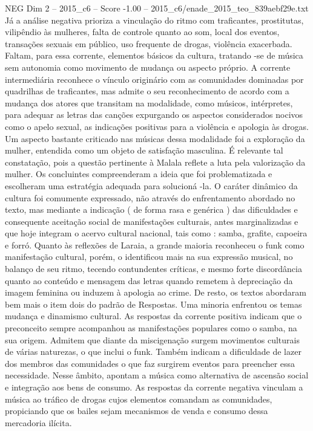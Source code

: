 \begin{textsample}{NEG Dim 2 – 2015\_c6 – Score -1.00 – 2015\_c6/enade\_2015\_teo\_839aebf29e.txt}
Já a análise negativa prioriza a vinculação do ritmo com traficantes, prostitutas, vilipêndio às mulheres, falta de controle quanto ao som, local dos eventos, transações sexuais em público, uso frequente de drogas, violência exacerbada.
Faltam, para essa corrente, elementos básicos da cultura, tratando -se de música sem autonomia como movimento de mudança ou aspecto próprio.
A corrente intermediária reconhece o vínculo originário com as comunidades dominadas por quadrilhas de traficantes, mas admite o seu reconhecimento de acordo com a mudança dos atores que transitam na modalidade, como músicos, intérpretes, para adequar as letras das canções expurgando os aspectos considerados nocivos como o apelo sexual, as indicações positivas para a violência e apologia às drogas.
Um aspecto bastante criticado nas músicas dessa modalidade foi a exploração da mulher, entendida como um objeto de satisfação masculina.
É relevante tal constatação, pois a questão pertinente à Malala reflete a luta pela valorização da mulher.
Os concluintes compreenderam a ideia que foi problematizada e escolheram uma estratégia adequada para solucioná -la.
O caráter dinâmico da cultura foi comumente expressado, não através do enfrentamento abordado no texto, mas mediante a indicação ( de forma rasa e genérica ) das dificuldades e consequente aceitação social de manifestações culturais, antes marginalizadas e que hoje integram o acervo cultural nacional, tais como : samba, grafite, capoeira e forró.
Quanto às reflexões de Laraia, a grande maioria reconheceu o funk como manifestação cultural, porém, o identificou mais na sua expressão musical, no balanço de seu ritmo, tecendo contundentes críticas, e mesmo forte discordância quanto ao conteúdo e mensagem das letras quando remetem à depreciação da imagem feminina ou induzem à apologia ao crime.
De resto, os textos abordaram bem mais o item dois do padrão de Respostas.
Uma minoria enfrentou os temas mudança e dinamismo cultural.
As respostas da corrente positiva indicam que o preconceito sempre acompanhou as manifestações populares como o samba, na sua origem.
Admitem que diante da miscigenação surgem movimentos culturais de várias naturezas, o que inclui o funk.
Também indicam a dificuldade de lazer dos membros das comunidades o que faz surgirem eventos para preencher essa necessidade.
Nesse âmbito, apontam a música como alternativa de ascensão social e integração aos bens de consumo.
As respostas da corrente negativa vinculam a música ao tráfico de drogas cujos elementos comandam as comunidades, propiciando que os bailes sejam mecanismos de venda e consumo dessa mercadoria ilícita.

\end{textsample}
